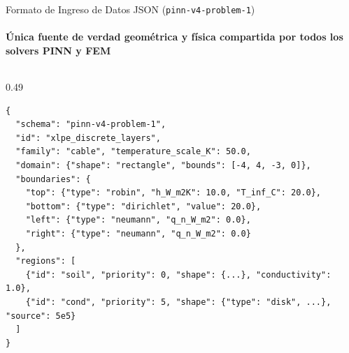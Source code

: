 \documentclass[aspectratio=169,11pt]{beamer}
\newcommand{\codelink}[2]{\href{run:#1}{\textcolor{Teal}{\underline{\texttt{#2}}}}}
\newenvironment{cardbox}[2][Teal]{%
  \begin{tikzpicture}
    \node[draw=#1!65,fill=SoftBg,rounded corners=4pt,line width=0.8pt,inner sep=4.5pt,text width=\dimexpr\linewidth-11pt\relax,align=left] \bgroup
    {\color{#1}\bfseries #2}\par\vspace{1pt}%
}{%
    \egroup;
  \end{tikzpicture}%
}
\newenvironment{citemize}{%
  \begin{itemize}\setlength\itemsep{2pt}\setlength\parskip{0pt}\setlength\parsep{0pt}\vspace{-2pt}%
}{%
  \end{itemize}\vspace{-2pt}%
}
\begin{document}
\begin{frame}[fragile]{Formato de Ingreso de Datos JSON (\texttt{pinn-v4-problem-1})}
  \framesubtitle{Única fuente de verdad geométrica y física compartida por todos los solvers PINN y FEM}
  \begin{columns}[T,totalwidth=\textwidth]
    \begin{column}{0.49\textwidth}
\begin{lstlisting}[basicstyle=\ttfamily\fontsize{6.8}{7.8}\selectfont]
{
  "schema": "pinn-v4-problem-1",
  "id": "xlpe_discrete_layers",
  "family": "cable", "temperature_scale_K": 50.0,
  "domain": {"shape": "rectangle", "bounds": [-4, 4, -3, 0]},
  "boundaries": {
    "top": {"type": "robin", "h_W_m2K": 10.0, "T_inf_C": 20.0},
    "bottom": {"type": "dirichlet", "value": 20.0},
    "left": {"type": "neumann", "q_n_W_m2": 0.0},
    "right": {"type": "neumann", "q_n_W_m2": 0.0}
  },
  "regions": [
    {"id": "soil", "priority": 0, "shape": {...}, "conductivity": 1.0},
    {"id": "cond", "priority": 5, "shape": {"type": "disk", ...}, "source": 5e5}
  ]
}
\end{lstlisting}
    \end{column}
  \end{columns}
\end{frame}
\end{document}

